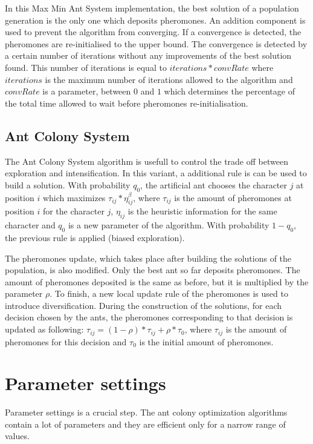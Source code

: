\documentclass{article}
\begin{document}
In this Max Min Ant System implementation, the best solution of a population generation is the only one which deposits pheromones.
An addition component is used to prevent the algorithm from converging.
If a convergence is detected, the pheromones are re-initialised to the upper bound.
The convergence is detected by a certain number of iterations without any improvements of the best solution found.
This number of iterations is equal to $iterations*convRate$ where $iterations$ is the maximum number of iterations allowed to the algorithm and $convRate$ is a parameter, between $0$ and $1$ which determines the percentage of the total time allowed to wait before pheromones re-initialisation.

\subsection{Ant Colony System}

The Ant Colony System algorithm is usefull to control the trade off between exploration and intensification.
In this variant, a additional rule is can be used to build a solution.
With probability $q_0$, the artificial ant chooses the character $j$ at position $i$ which maximizes $\tau_{ij}*\eta_{ij}^{\beta}$, where $\tau_{ij}$ is the amount of pheromones at position $i$ for the character $j$, $\eta_{ij}$ is the heuristic information for the same character and $q_0$ is a new parameter of the algorithm.
With probability $1-q_0$, the previous rule is applied (biased exploration).\newline

The pheromones update, which takes place after building the solutions of the population, is also modified.
Only the best ant so far deposits pheromones.
The amount of pheromones deposited is the same as before, but it is multiplied by the parameter $\rho$.
To finish, a new local update rule of the pheromones is used to introduce diversification.
During the construction of the solutions, for each decision chosen by the ants, the pheromones corresponding to that decision is updated as following: $\tau_{ij}=(1-\rho)*\tau_{ij}+\rho*\tau_0$, where $\tau_{ij}$ is the amount of pheromones for this decision and $\tau_0$ is the initial amount of pheromones.

\section{Parameter settings}

Parameter settings is a crucial step.
The ant colony optimization algorithms contain a lot of parameters and they are efficient only for a narrow range of values. \newline
\end{document}
